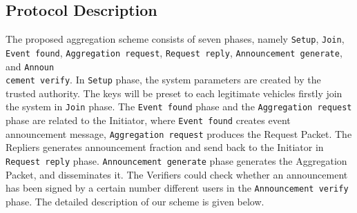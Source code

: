 \documentclass[a4paper]{article}
\begin{document}
\subsection{Protocol Description}
The proposed aggregation scheme consists of seven phases, namely \texttt{Setup}, \texttt{Join}, \texttt{Event found}, \texttt{Aggregation request}, \texttt{Request reply}, \texttt{Announcement generate}, and \texttt{Announ\\cement verify}. In \texttt{Setup} phase, the system parameters are created by the trusted authority. The keys will be preset to each legitimate vehicles firstly join the system in \texttt{Join} phase. The \texttt{Event found} phase and the \texttt{Aggregation request} phase are related to the Initiator, where \texttt{Event found} creates event announcement message, \texttt{Aggregation request} produces the Request Packet. The Repliers generates announcement fraction and send back to the Initiator in \texttt{Request reply} phase. \texttt{Announcement generate} phase generates the Aggregation Packet, and disseminates it. The Verifiers could check whether an announcement has been signed by a certain number different users in the \texttt{Announcement verify} phase. The detailed description of our scheme is given below.
\end{document}
